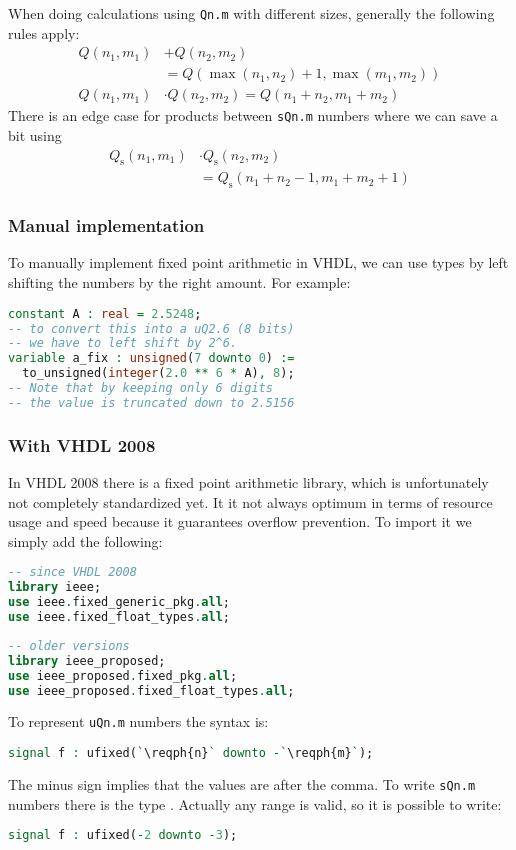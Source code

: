 \documentclass[margin=small]{tex/hsrzf}
\begin{document}
When doing calculations using \texttt{Qn.m} with different sizes, generally the following rules apply:
\begin{align*}
  Q(n_1, m_1) &+ Q(n_2, m_2) \\
    &= Q(\max(n_1, n_2) +1, \max(m_1, m_2)) \\
  Q(n_1, m_1) &\cdot Q(n_2, m_2) = Q(n_1 + n_2, m_1 + m_2)
\end{align*}
There is an edge case for products between \texttt{sQn.m} numbers where we can save a bit using
\begin{align*}
  Q_\mathrm{s}(n_1, m_1) &\cdot Q_\mathrm{s}(n_2, m_2) \\
  &= Q_\mathrm{s}(n_1 + n_2 -1, m_1 + m_2 + 1)
\end{align*}

\subsubsection{Manual implementation}

To manually implement fixed point arithmetic in VHDL, we can use  types by left shifting the numbers by the right amount. For example:
\begin{lstlisting}[language = vhdl]
constant A : real = 2.5248;
-- to convert this into a uQ2.6 (8 bits)
-- we have to left shift by 2^6.
variable a_fix : unsigned(7 downto 0) :=
  to_unsigned(integer(2.0 ** 6 * A), 8);
-- Note that by keeping only 6 digits
-- the value is truncated down to 2.5156
\end{lstlisting}

\subsubsection{With VHDL 2008 }

In VHDL 2008 there is a fixed point arithmetic library, which is unfortunately not completely standardized yet. It it not always optimum in terms of resource usage and speed because it guarantees overflow prevention. To import it we simply add the following:
\begin{lstlisting}[language = vhdl]
-- since VHDL 2008
library ieee;
use ieee.fixed_generic_pkg.all;
use ieee.fixed_float_types.all;
\end{lstlisting}
\begin{lstlisting}[language = vhdl]
-- older versions
library ieee_proposed;
use ieee_proposed.fixed_pkg.all;
use ieee_proposed.fixed_float_types.all;
\end{lstlisting}
To represent \texttt{uQn.m} numbers the syntax is:
\begin{lstlisting}[language = vhdl]
signal f : ufixed(`\reqph{n}` downto -`\reqph{m}`);
\end{lstlisting}
The minus sign implies that the values are after the comma.  To write \texttt{sQn.m} numbers there is the type .  Actually any range is valid, so it is possible to write:
\begin{lstlisting}[language = vhdl]
signal f : ufixed(-2 downto -3);
\end{lstlisting}
\end{document}
